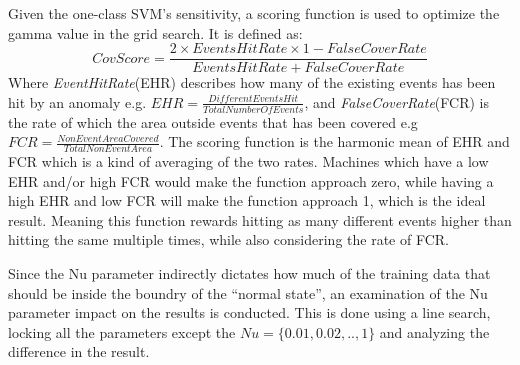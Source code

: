 Given the one-class SVM's sensitivity, a scoring function is used to optimize the gamma value in the grid search. It is defined as: 
\[CovScore = \frac{2 \times EventsHitRate \times 1-FalseCoverRate}{EventsHitRate + FalseCoverRate}\]
Where \textit{EventHitRate}(EHR) describes how many of the existing events has been hit by an anomaly e.g. $EHR = \frac{DifferentEventsHit}{TotalNumberOfEvents}$, and \textit{FalseCoverRate}(FCR) is the rate of which the area outside events that has been covered e.g $FCR = \frac{NonEventAreaCovered}{TotalNonEventArea}$. 
The scoring function is the harmonic mean of EHR and FCR which is a kind of averaging of the two rates.
Machines which have a low EHR and/or high FCR would make the function approach zero, while having a high EHR and low FCR will make the function approach 1, which is the ideal result.
Meaning this function rewards hitting as many different events higher than hitting the same multiple times, while also considering the rate of FCR.

Since the Nu parameter indirectly dictates how much of the training data that should be inside the boundry of the ``normal state'', an examination of the Nu parameter impact on the results is conducted.
This is done using a line search, locking all the parameters except the $Nu = \{0.01, 0.02,.., 1\}$ and analyzing the difference in the result. 
